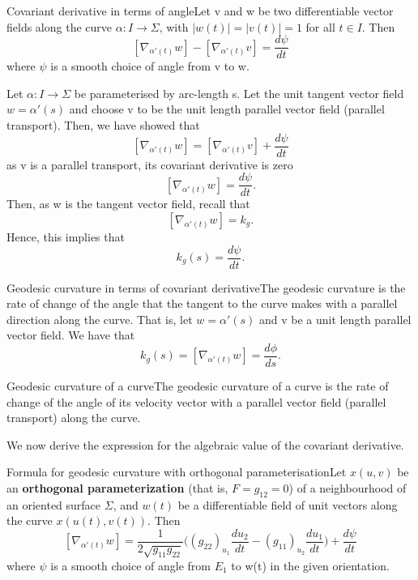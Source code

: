 \documentclass[twoside]{article}
\begin{document}
\begin{proposition_exam}{Covariant derivative in terms of angle}{}Let v and w be two differentiable vector fields along the curve $\alpha:I \rightarrow \Sigma$, with $|w(t)| = |v(t)| = 1$ for all $t \in I.$ Then 
$$
[\nabla_{\alpha'(t)}w] - [\nabla_{\alpha'(t)}v] = \frac{d\psi}{dt}
$$
where $\psi$ is a smooth choice of angle from v to w.
\end{proposition_exam}

Let $\alpha: I \rightarrow \Sigma$ be parameterised by arc-length s. Let the unit tangent vector field $w = \alpha'(s)$ and choose v to be the unit length parallel vector field (parallel transport). Then, we have showed that 
$$
[\nabla_{\alpha'(t)}w] = [\nabla_{\alpha'(t)}v] + \frac{d\psi}{dt}
$$
as v is a parallel transport, its covariant derivative is zero 
$$
[\nabla_{\alpha'(t)}w] = \frac{d\psi}{dt}.
$$
Then, as w is the tangent vector field, recall that 
$$
[\nabla_{\alpha'(t)}w] = k_g.
$$
Hence, this implies that 
$$
k_g(s) = \frac{d\psi}{dt}.
$$

\begin{proposition_exam}{Geodesic curvature in terms of covariant derivative}{}The geodesic curvature is the rate of change of the angle that the tangent to the curve makes with a parallel direction along the curve. That is, let $w = \alpha'(s)$ and v be a unit length parallel vector field. We have that
$$
k_g(s) = [\nabla_{\alpha'(t)}w] = \frac{d\phi}{ds}.
$$
\end{proposition_exam}

\begin{theorem_exam}{Geodesic curvature of a curve}{}The geodesic curvature of a curve is the rate of change of the angle of its velocity vector with a parallel vector field (parallel transport) along the curve.
\end{theorem_exam}

We now derive the expression for the algebraic value of the covariant derivative.

\begin{proposition_exam}{Formula for geodesic curvature with orthogonal parameterisation}{}Let $x(u,v)$ be an \textbf{orthogonal parameterization} (that is, $F = g_{12} = 0$) of a neighbourhood of an oriented surface $\Sigma$, and $w(t)$ be a differentiable field of unit vectors along the curve $x(u(t), v(t)).$ Then 
$$
[\nabla_{\alpha'(t)}w] = \frac{1}{2\sqrt{g_{11}g_{22}}}\bigg((g_{22})_{u_{1}}\frac{du_2}{dt} - (g_{11})_{u_{2}}\frac{du_1}{dt} \bigg) + \frac{d\psi}{dt}
$$
where $\psi$ is a smooth choice of angle from $E_1$ to w(t) in the given orientation.
\end{proposition_exam}
\end{document}
